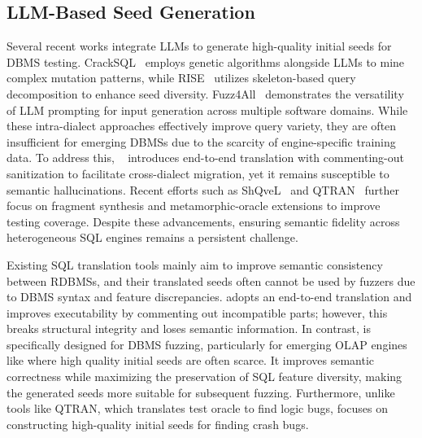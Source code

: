 \documentclass[sigconf,review,anonymous]{acmart}
\begin{document}
\subsection{LLM-Based Seed Generation}
Several recent works integrate LLMs to generate high-quality initial seeds for DBMS testing. CrackSQL~\cite{zhou2025cracking} employs genetic algorithms alongside LLMs to mine complex mutation patterns, while RISE~\cite{xie2026rise} utilizes skeleton-based query decomposition to enhance seed diversity. Fuzz4All~\cite{xia2024fuzz4all} demonstrates the versatility of LLM prompting for input generation across multiple software domains. While these intra-dialect approaches effectively improve query variety, they are often insufficient for emerging DBMSs due to the scarcity of engine-specific training data. To address this, \sedar{}~\cite{fu2024sedar} introduces end-to-end translation with commenting-out sanitization to facilitate cross-dialect migration, yet it remains susceptible to semantic hallucinations. Recent efforts such as ShQveL~\cite{zhong2025testing} and QTRAN~\cite{lin2025qtran} further focus on fragment synthesis and metamorphic-oracle extensions to improve testing coverage. Despite these advancements, ensuring semantic fidelity across heterogeneous SQL engines remains a persistent challenge.

Existing SQL translation tools mainly aim to improve semantic consistency between RDBMSs, and their translated seeds often cannot be used by fuzzers due to DBMS syntax and feature discrepancies. \sedar{} adopts an end-to-end translation and improves executability by commenting out incompatible parts; however, this breaks structural integrity and loses semantic information. 
In contrast, \tool{} is specifically designed for DBMS fuzzing, particularly for emerging OLAP engines like \clickhouse{} where high quality initial seeds are often scarce. It improves semantic correctness while maximizing the preservation of SQL feature diversity, making the generated seeds more suitable for subsequent fuzzing. Furthermore, unlike tools like QTRAN, which translates test oracle to find logic bugs, \tool{} focuses on constructing high-quality initial seeds for finding crash bugs.


\end{document}
